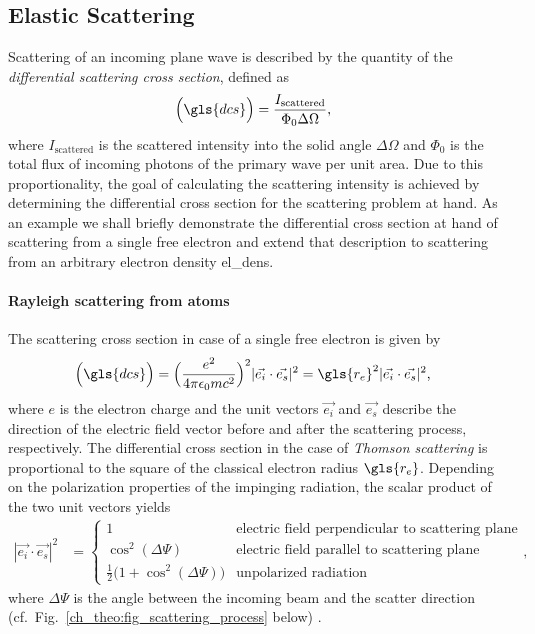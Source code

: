 \subsection{Elastic Scattering} \label{ch_theo:sec_elastic_scattering}
Scattering of an incoming plane wave is described by the quantity of the \emph{differential scattering cross section}, defined as
\begin{align}
\Big(\gls{dcs}\Big) &= \frac{I_\text{scattered}}{\Phi_0 \Delta \Omega}\text{,}
\end{align}
where $I_\text{scattered}$ is the scattered intensity into the solid angle $\Delta \Omega$ and $\Phi_0$ is the total flux of incoming photons of the primary wave per unit area. Due to this proportionality, the goal of calculating the scattering intensity is achieved by determining the differential cross section for the scattering problem at hand. As an example we shall briefly demonstrate the differential cross section at hand of scattering from a single free electron and extend that description to scattering from an arbitrary electron density \gls{el_dens}.

\paragraph{Rayleigh scattering from atoms}
The scattering cross section in case of a single free electron is given by
\begin{align}
 \Big(\gls{dcs}\Big) &= \Big(\frac{e^2}{4 \pi \epsilon_0 m c^2}\Big)^2 |\vec{e_i} \cdot \vec{e_s}|^2 = \gls{r_e}^2 |\vec{e_i} \cdot \vec{e_s}|^2 \text{,}
\end{align}
where $e$ is the electron charge and the unit vectors $\vec{e_i}$ and $\vec{e_s}$ describe the direction of the electric field vector before and after the scattering process, respectively. The differential cross section in the case of \emph{Thomson scattering} is proportional to the square of the classical electron radius $\gls{r_e}$. Depending on the polarization properties of the impinging radiation, the scalar product of the two unit vectors yields
\begin{align}
|\vec{e_i} \cdot \vec{e_s}|^2 &= \begin{cases}
    1 & \text{electric field perpendicular to scattering plane} \\
    \cos^2(\Delta \Psi) & \text{electric field parallel to scattering plane} \\
    \frac{1}{2}\big(1+\cos^2(\Delta \Psi)\big) & \text{unpolarized radiation}
\end{cases} \text{,}
\end{align}
where $\Delta \Psi$ is the angle between the incoming beam and the scatter direction (cf.~Fig.~\ref{ch_theo:fig_scattering_process} below) \cite{als-nielsen_x-rays_2011}.

